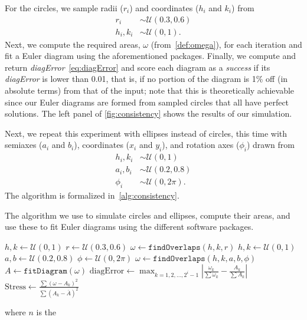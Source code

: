 \documentclass[
  a4paper,
  nofonts,
  nobib,
  nohyper,
  openany
]{tufte-book}\usepackage[]{graphicx}\usepackage[]{color}
\begin{document}
For the circles, we sample radii ($r_i$) and coordinates ($h_i$ and $k_i$) from
\begin{equation}
\begin{aligned}
r_i     & \sim \mathcal{U}(0.3, 0.6)\\
h_i,k_i & \sim \mathcal{U}(0, 1).
\end{aligned}
\label{eq:consistencyCircles}
\end{equation}
Next, we compute the required areas, $\omega$ (from~\cref{def:omega}), for each iteration and fit a Euler diagram using the aforementioned packages. Finally, we compute and return \emph{diagError}~\eqref{eq:diagError} and score each diagram as a \emph{success} if its \emph{diagError} is lower than 0.01, that is, if no portion of the diagram is 1\% off (in absolute terms) from that of the input; note that this is theoretically achievable since our Euler diagrams are formed from sampled circles that all have perfect solutions. The left panel of \cref{fig:consistency} shows the results of our simulation.

Next, we repeat this experiment with ellipses instead of circles, this time with semiaxes ($a_i$ and $b_i$), coordinates ($x_i$ and $y_i$), and rotation axes ($\phi_i$) drawn from
%
\begin{equation}
\begin{aligned}
h_i,k_i & \sim \mathcal{U}(0, 1)\\
a_i,b_i & \sim \mathcal{U}(0.2, 0.8)\\
\phi_i  & \sim \mathcal{U}(0, 2\pi).
\end{aligned}
\label{eq:consistencyEllipses}
\end{equation}
%
The algorithm is formalized in~\cref{alg:consistency}.

\begin{algorithm}[htb]
\caption{The algorithm we use to simulate circles and ellipses, compute their areas, and use these to fit Euler diagrams using the different software packages.}
\label{alg:consistency}
\begin{algorithmic}[1]
      \STATE $h,k    \leftarrow \mathcal{U}(0, 1)$
      \STATE $r      \leftarrow \mathcal{U}(0.3, 0.6)$
      \STATE $\omega \leftarrow \mathtt{ findOverlaps}(h, k, r)$
      \STATE $h,k    \leftarrow \mathcal{U}(0, 1)$
      \STATE $a,b    \leftarrow \mathcal{U}(0.2, 0.8)$
      \STATE $\phi   \leftarrow \mathcal{U}(0, 2\pi)$
      \STATE $\omega \leftarrow \mathtt{ findOverlaps}(h, k, a, b, \phi)$
    \ENDIF
    \STATE $A \leftarrow \mathtt{ fitDiagram}(\omega)$
    \STATE $\text{diagError} \leftarrow \max_{k=1,2,\dots,2^i-1} \left| \frac{\omega_k}{\sum \omega_k} - \frac{A_k}{\sum A_k} \right|$
    \STATE $\text{Stress} \leftarrow \frac{\sum (\omega - A_k)^2}{\sum (A_k - \bar{A})^2}$
  \ENDFOR
\ENDFOR

\end{algorithmic}
where $n$ is the
\end{algorithm}
\end{document}
